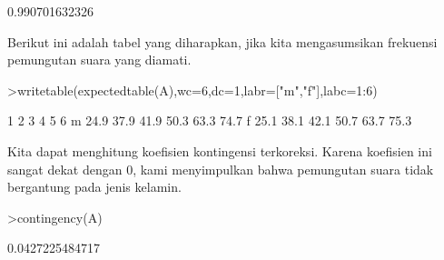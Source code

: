 \documentclass[a4paper,10pt]{article}
\begin{document}
\begin{eulernotebook}
\begin{eulercomment}
\begin{eulercomment}
\begin{eulercomment}
\begin{eulercomment}
\begin{eulercomment}
\begin{eulercomment}
\begin{eulercomment}
\begin{eulercomment}
\begin{eulercomment}
\begin{eulercomment}
\begin{eulercomment}
\begin{eulercomment}
\begin{eulercomment}
\begin{eulercomment}
\begin{eulercomment}
\begin{eulercomment}
\begin{eulercomment}
\begin{eulercomment}
\begin{eulercomment}
\begin{eulercomment}
\begin{eulercomment}
\begin{eulercomment}
\begin{eulercomment}
\begin{eulercomment}
\begin{eulercomment}
\begin{eulercomment}
\begin{eulercomment}
\begin{eulercomment}
\begin{eulercomment}
\begin{eulercomment}
\begin{eulercomment}
\begin{eulercomment}
\begin{eulercomment}
\begin{eulercomment}
\begin{eulercomment}
\begin{eulercomment}
\begin{eulercomment}
\begin{eulercomment}
\begin{eulercomment}
\begin{eulercomment}
\begin{eulercomment}
\begin{eulercomment}
\begin{eulercomment}
\begin{eulercomment}
\begin{euleroutput}
  0.990701632326
\end{euleroutput}
\begin{eulercomment}
Berikut ini adalah tabel yang diharapkan, jika kita mengasumsikan
frekuensi pemungutan suara yang diamati.
\end{eulercomment}
\begin{eulerprompt}
>writetable(expectedtable(A),wc=6,dc=1,labr=["m","f"],labc=1:6)
\end{eulerprompt}
\begin{euleroutput}
             1     2     3     4     5     6
       m  24.9  37.9  41.9  50.3  63.3  74.7
       f  25.1  38.1  42.1  50.7  63.7  75.3
\end{euleroutput}
\begin{eulercomment}
Kita dapat menghitung koefisien kontingensi terkoreksi. Karena
koefisien ini sangat dekat dengan 0, kami menyimpulkan bahwa
pemungutan suara tidak bergantung pada jenis kelamin.
\end{eulercomment}
\begin{eulerprompt}
>contingency(A)
\end{eulerprompt}
\begin{euleroutput}
  0.0427225484717
\end{euleroutput}
\begin{eulercomment}
\begin{eulercomment}

\end{eulercomment}
\end{eulercomment}
\end{eulercomment}
\end{eulercomment}
\end{eulercomment}
\end{eulercomment}
\end{eulercomment}
\end{eulercomment}
\end{eulercomment}
\end{eulercomment}
\end{eulercomment}
\end{eulercomment}
\end{eulercomment}
\end{eulercomment}
\end{eulercomment}
\end{eulercomment}
\end{eulercomment}
\end{eulercomment}
\end{eulercomment}
\end{eulercomment}
\end{eulercomment}
\end{eulercomment}
\end{eulercomment}
\end{eulercomment}
\end{eulercomment}
\end{eulercomment}
\end{eulercomment}
\end{eulercomment}
\end{eulercomment}
\end{eulercomment}
\end{eulercomment}
\end{eulercomment}
\end{eulercomment}
\end{eulercomment}
\end{eulercomment}
\end{eulercomment}
\end{eulercomment}
\end{eulercomment}
\end{eulercomment}
\end{eulercomment}
\end{eulercomment}
\end{eulercomment}
\end{eulercomment}
\end{eulercomment}
\end{eulercomment}
\end{eulercomment}
\end{eulernotebook}
\end{document}
